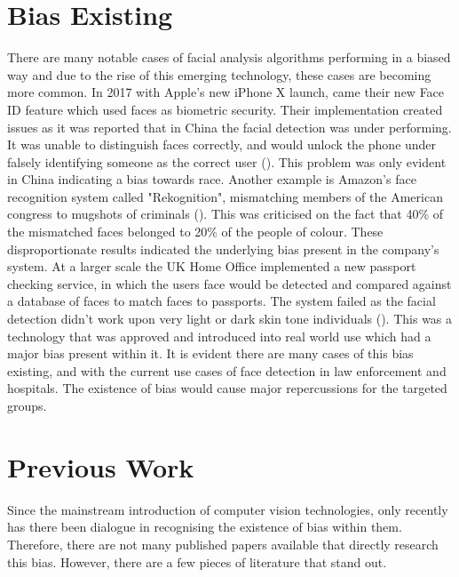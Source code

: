 \documentclass{l4proj}
\begin{document}
\section{Bias Existing}
\label{bias}
There are many notable cases of facial analysis algorithms performing in a biased way and due to the rise of this emerging technology, these cases are becoming more common. In 2017 with Apple's new iPhone X launch, came their new Face ID feature which used faces as biometric security. Their implementation created issues as it was reported that in China the facial detection was under performing. It was unable to distinguish faces correctly, and would unlock the phone under falsely identifying someone as the correct user (\cite{iphone}). This problem was only evident in China indicating a bias towards race. Another example is Amazon's face recognition system called "Rekognition", mismatching members of the American congress to mugshots of criminals (\cite{amazon}). This was criticised on the fact that 40\% of the mismatched faces belonged to 20\% of the people of colour. These disproportionate results indicated the underlying bias present in the company's system. At a larger scale the UK Home Office implemented a new passport checking service, in which the users face would be detected and compared against a database of faces to match faces to passports. The system failed as the facial detection didn't work upon very light or dark skin tone individuals (\cite{passport}). This was a technology that was approved and introduced into real world use which had a major bias present within it. It is evident there are many cases of this bias existing, and with the current use cases of face detection in law enforcement and hospitals. The existence of bias would cause major repercussions for the targeted groups.
\section{Previous Work}
Since the mainstream introduction of computer vision technologies, only recently has there been dialogue in recognising the existence of bias within them. Therefore, there are not many published papers available that directly research this bias. However, there are a few pieces of literature that stand out.
\end{document}
